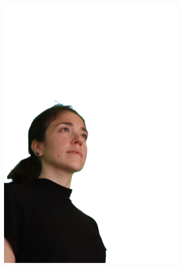 \begin{figure}[!ht]
\begin{subfigure}{0.12\linewidth}
        \includegraphics[width=\textwidth]{Figures/results/initials/irene/14_render.png}

\end{subfigure}
\end{figure}
